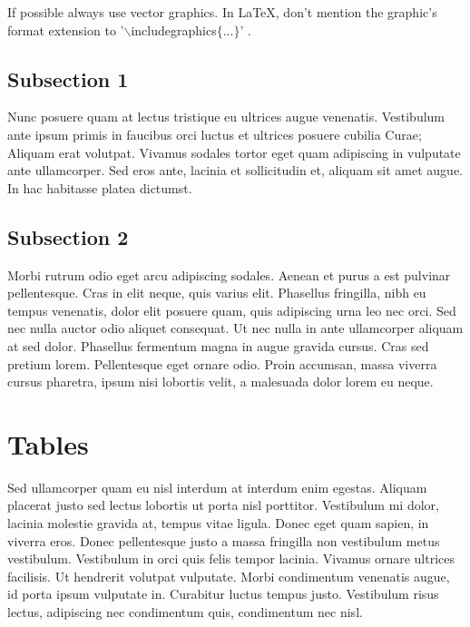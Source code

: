 If possible always use vector graphics. In \LaTeX, don't mention the graphic's format extension to '$\backslash$includegraphics$\lbrace...\rbrace$' \cite{empty_book}.

\subsection{Subsection 1}

Nunc posuere quam at lectus tristique eu ultrices augue venenatis. Vestibulum ante ipsum primis in faucibus orci luctus et ultrices posuere cubilia Curae; Aliquam erat volutpat. Vivamus sodales tortor eget quam adipiscing in vulputate ante ullamcorper. Sed eros ante, lacinia et sollicitudin et, aliquam sit amet augue. In hac habitasse platea dictumst.


\subsection{Subsection 2}
Morbi rutrum odio eget arcu adipiscing sodales. Aenean et purus a est pulvinar pellentesque. Cras in elit neque, quis varius elit. Phasellus fringilla, nibh eu tempus venenatis, dolor elit posuere quam, quis adipiscing urna leo nec orci. Sed nec nulla auctor odio aliquet consequat. Ut nec nulla in ante ullamcorper aliquam at sed dolor. Phasellus fermentum magna in augue gravida cursus. Cras sed pretium lorem. Pellentesque eget ornare odio. Proin accumsan, massa viverra cursus pharetra, ipsum nisi lobortis velit, a malesuada dolor lorem eu neque.


\section{Tables}

Sed ullamcorper quam eu nisl interdum at interdum enim egestas. Aliquam placerat justo sed lectus lobortis ut porta nisl porttitor. Vestibulum mi dolor, lacinia molestie gravida at, tempus vitae ligula. Donec eget quam sapien, in viverra eros. Donec pellentesque justo a massa fringilla non vestibulum metus vestibulum. Vestibulum in orci quis felis tempor lacinia. Vivamus ornare ultrices facilisis. Ut hendrerit volutpat vulputate. Morbi condimentum venenatis augue, id porta ipsum vulputate in. Curabitur luctus tempus justo. Vestibulum risus lectus, adipiscing nec condimentum quis, condimentum nec nisl.

